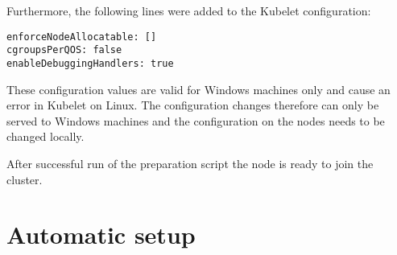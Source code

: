 Furthermore, the following lines were added to the Kubelet configuration:
\begin{lstlisting}[label=lst:master.configtoml_changes, caption={Configuration changes in ContainerD configuration file (\textit{config.toml})\cite{GitHubKubernetesSIGWindowsTools.20230213}}]
enforceNodeAllocatable: []
cgroupsPerQOS: false
enableDebuggingHandlers: true
\end{lstlisting}
These configuration values are valid for \ac{Windows} machines only and cause an error in Kubelet on Linux. The configuration changes therefore can only be served to Windows machines and the configuration on the nodes needs to be changed locally.


After successful run of the preparation script the node is ready to join the cluster.


\section{Automatic setup}



